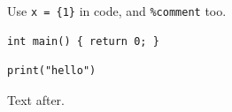 \documentclass{article}
\begin{document}
Use \verb|x = {1}| in code, and \verb+%comment+ too.
\begin{verbatim}
int main() { return 0; }
\end{verbatim}
\begin{lstlisting}
print("hello")
\end{lstlisting}
Text after.
\end{document}
